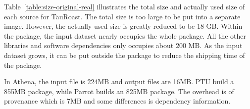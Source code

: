 Table~\ref{table:size-original-real} illustrates the total size and actually used size of each source for TauRoast. 
The total size is too large to be put into a separate image. However, the actually used size is greatly reduced to be 18 GB.
Within the package, the input dataset nearly occupies the whole package. All the other libraries and software dependencies only occupies about 200 MB.
As the input dataset grows, it can be put outside the package to reduce the shipping time of the package.

In Athena, the input file is 224MB and output files are 16MB. PTU build a 855MB package, while Parrot builds an 825MB package. The overhead is of provenance which is 7MB and 
some differences is dependency information. 
